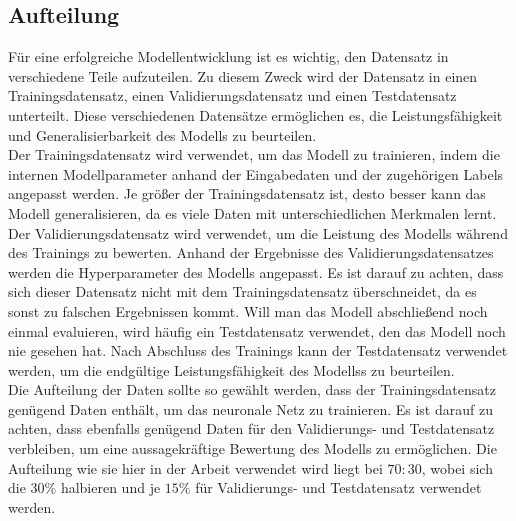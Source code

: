\subsection{Aufteilung}
Für eine erfolgreiche Modellentwicklung ist es wichtig, den Datensatz in verschiedene Teile aufzuteilen. Zu diesem Zweck wird der Datensatz in einen Trainingsdatensatz, einen Validierungsdatensatz und einen Testdatensatz unterteilt. Diese verschiedenen Datensätze ermöglichen es, die Leistungsfähigkeit und Generalisierbarkeit des \gls{Modell}s zu beurteilen. \\
Der Trainingsdatensatz wird verwendet, um das Modell zu trainieren, indem die internen Modellparameter anhand der Eingabedaten und der zugehörigen Labels angepasst werden. Je größer der Trainingsdatensatz ist, desto besser kann das \gls{Modell} generalisieren, da es viele Daten mit unterschiedlichen Merkmalen lernt. \\
Der Validierungsdatensatz wird verwendet, um die Leistung des \gls{Modell}s während des Trainings zu bewerten. Anhand der Ergebnisse des Validierungsdatensatzes werden die Hyperparameter des \gls{Modell}s angepasst. Es ist darauf zu achten, dass sich dieser Datensatz nicht mit dem Trainingsdatensatz überschneidet, da es sonst zu falschen Ergebnissen kommt. \cite[vgl.][]{Weidman2020} Will man das Modell abschließend noch einmal evaluieren, wird häufig ein Testdatensatz verwendet, den das \gls{Modell} noch nie gesehen hat. Nach Abschluss des Trainings kann der Testdatensatz verwendet werden, um die endgültige Leistungsfähigkeit des \glspl{Modell}s zu beurteilen. \\
Die Aufteilung der Daten sollte so gewählt werden, dass der Trainingsdatensatz genügend Daten enthält, um das neuronale Netz zu trainieren. Es ist darauf zu achten, dass ebenfalls genügend Daten für den Validierungs- und Testdatensatz verbleiben, um eine aussagekräftige Bewertung des \gls{Modell}s zu ermöglichen. Die Aufteilung wie sie hier in der Arbeit verwendet wird liegt bei $70:30$, wobei sich die $30\%$ halbieren und je $15\%$ für Validierungs- und Testdatensatz verwendet werden.